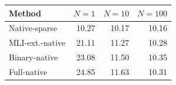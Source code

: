 \begin{tabular}{lrrr}
\toprule
Method & $N=1$ & $N=10$ & $N=100$ \\
\midrule
Native-sparse & 10.27 & 10.17 & 10.16 \\
MLI-ext.-native & 21.11 & 11.27 & 10.28 \\
Binary-native & 23.08 & 11.50 & 10.35 \\
Full-native & 24.85 & 11.63 & 10.31 \\
\bottomrule
\end{tabular}
